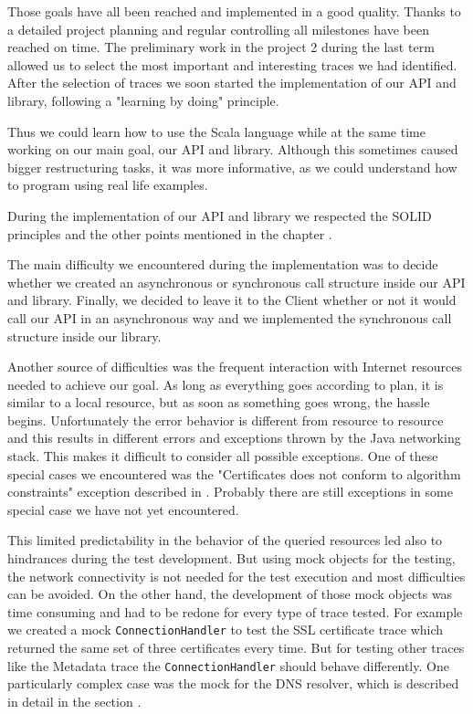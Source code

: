 \documentclass[
	a4paper,					10pt,							twoside,					openright,				notitlepage,			parskip=half,			]{scrreprt}
\begin{document}
Those goals have all been reached and implemented in a good quality. Thanks to a detailed project planning and regular controlling
all milestones have been reached on time. The preliminary work in the project 2 during the last term allowed us to select the most
important and interesting traces we had identified. 
After the selection of traces we soon started the implementation of our \gls{API} and 
library, following a "learning by doing" principle. 

Thus we could learn how to use the Scala language while at the same time working
on our main goal, our \gls{API} and library. Although this sometimes caused bigger restructuring tasks, it was more informative, as we could
understand how to program using real life examples.

During the implementation of our \gls{API} and library we respected the \gls{SOLID} principles and the other points mentioned in the chapter
. 

The main difficulty we encountered during the implementation was to decide whether we created an asynchronous or
synchronous call structure inside our \gls{API} and library. Finally, we decided to leave it to the Client whether or not it would call our \gls{API}
in an asynchronous way and we implemented the synchronous call structure inside our library.

Another source of difficulties was the frequent interaction with Internet resources needed to achieve our goal. As long as everything goes according
to plan, it is similar to a local resource, but as soon as something goes wrong, the hassle begins. Unfortunately the error behavior is different
from resource to resource and this results in different errors and exceptions thrown by the Java networking stack. This makes it difficult 
to consider all possible exceptions. One of these special cases we encountered was the  "Certificates does not conform to algorithm constraints"
exception described in . Probably there are still exceptions in some special case we have not yet encountered. 

This limited predictability in the behavior of the queried resources led also to hindrances during the test development. But using mock objects 
for the testing, the network connectivity is not needed for the test execution and most difficulties can be avoided. On the other hand, the 
development of those mock objects was time consuming and had to be redone for every type of trace tested. For example we created a mock \verb|ConnectionHandler| 
to test the SSL certificate trace which returned the same set of three certificates every time. But for testing other traces like the Metadata trace
the \verb|ConnectionHandler| should behave differently. One particularly complex case was the mock for the DNS resolver, which is described in detail
in the section .
\end{document}
